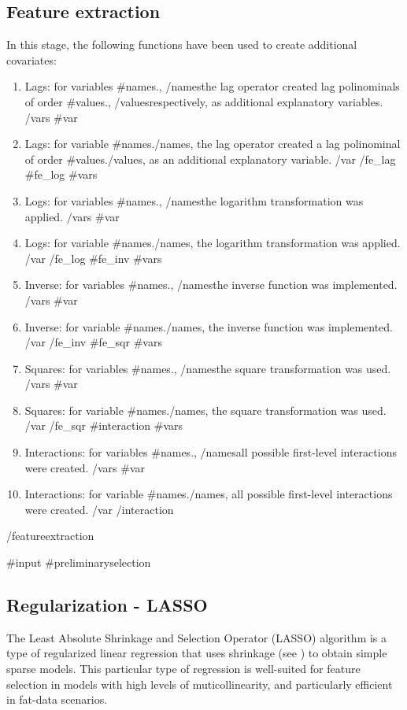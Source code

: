 \documentclass{article}
\begin{document}
\subsection{Feature extraction}

In this stage, the following functions have been used to create additional covariates:  

\begin{enumerate}
  {{#fe_lag}}
    {{#vars}}
    \item Lags: for variables {{#names}}{{.}}, {{/names}}the lag operator created lag polinominals of order {{#values}}{{.}}, {{/values}}respectively, as additional explanatory variables.
    {{/vars}}
    {{#var}}
    \item Lags: for variable {{#names}}{{.}}{{/names}}, the lag operator created a lag polinominal of order {{#values}}{{.}}{{/values}}, as an additional explanatory variable.
    {{/var}}
  {{/fe_lag}}
  {{#fe_log}}
    {{#vars}}
    \item Logs: for variables {{#names}}{{.}}, {{/names}}the logarithm transformation was applied.
    {{/vars}}
    {{#var}}
    \item Logs: for variable {{#names}}{{.}}{{/names}}, the logarithm transformation was applied.
    {{/var}}
  {{/fe_log}}
  {{#fe_inv}}
    {{#vars}}
    \item Inverse: for variables {{#names}}{{.}}, {{/names}}the inverse function was implemented.
    {{/vars}}
    {{#var}}
    \item Inverse: for variable {{#names}}{{.}}{{/names}}, the inverse function was implemented.
    {{/var}}
  {{/fe_inv}}
  {{#fe_sqr}}
    {{#vars}}
    \item Squares: for variables {{#names}}{{.}}, {{/names}}the square transformation was used.
    {{/vars}}
    {{#var}}
    \item Squares: for variable {{#names}}{{.}}{{/names}}, the square transformation was used.
    {{/var}}
  {{/fe_sqr}} 
  {{#interaction}}
    {{#vars}}
    \item Interactions: for variables {{#names}}{{.}}, {{/names}}all possible first-level interactions were created.
    {{/vars}}
    {{#var}}
    \item Interactions: for variable {{#names}}{{.}}{{/names}}, all possible first-level interactions were created.
    {{/var}}
  {{/interaction}}
\end{enumerate}
{{/featureextraction}}

{{#input}}
{{#preliminaryselection}}
\subsection{Regularization - LASSO}
The Least Absolute Shrinkage and Selection Operator (LASSO) algorithm is a type of regularized linear regression that uses shrinkage (see \cite{tibshirani1996}) to obtain simple sparse models. This particular type of regression is well-suited for feature selection in models with high levels of muticollinearity, and particularly efficient in fat-data scenarios.
\end{document}
